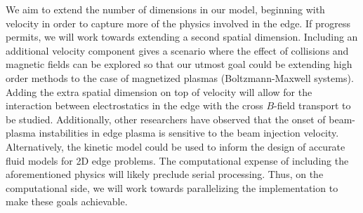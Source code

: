 \documentclass[11pt,titlepage]{report}
\begin{document}
We aim to extend the number of dimensions in our model, beginning with velocity in order to capture more of the physics involved in the edge. If progress permits, we will work towards extending a second spatial dimension. Including an additional velocity component gives a scenario where the effect of collisions and magnetic fields can be explored so that our utmost goal could be extending high order methods to the case of magnetized plasmas (Boltzmann-Maxwell systems). Adding the extra spatial dimension on top of velocity will allow for the interaction between electrostatics in the edge with the cross $B$-field transport to be studied. Additionally, other researchers have observed that the onset of beam-plasma instabilities in edge plasma is sensitive to the beam injection velocity. Alternatively, the kinetic model could be used to inform the design of accurate fluid models for 2D edge problems. The computational expense of including the aforementioned physics will likely preclude serial processing. Thus, on the computational side, we will work towards parallelizing the implementation to make these goals achievable.

\newpage




\cleardoublepage


\nocite{*}




%
\end{document}
